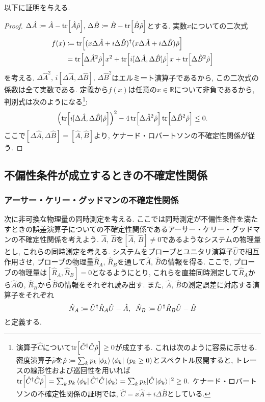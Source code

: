 以下に証明を与える. 
\begin{proof}
\(\Delta\hat{A}\coloneqq\hat{A}-\tr[\hat{A}\hat{\rho}],\,\Delta\hat{B}\coloneqq\hat{B}-\tr[\hat{B}\hat{\rho}]\)とする. 実数\(x\)についての二次式
\begin{equation}
  \begin{aligned}
    f(x)&\coloneqq\tr[(x\Delta\hat{A}+i\Delta\hat{B})^\dag(x\Delta\hat{A}+i\Delta\hat{B})\hat{\rho}]\\
    &=\tr[\Delta\hat{A}^2\hat{\rho}]x^2+\tr[i[\Delta\hat{A},\Delta\hat{B}]\hat{\rho}]x+\tr[\Delta\hat{B}^2\hat{\rho}]
  \end{aligned}
\end{equation}
を考える. \(\Delta\hat{A}^2,\,i[\Delta\hat{A},\Delta\hat{B}],\,\Delta\hat{B}^2\)はエルミート演算子であるから, この二次式の係数は全て実数である. 定義から\(f(x)\)は任意の\(x\in\mathbb{R}\)について非負であるから, 判別式は次のようになる\footnote{演算子\(\hat{C}\)について\(\tr[\hat{C}^\dag\hat{C}\hat{\rho}]\geq0\)が成立する. これは次のように容易に示せる. 密度演算子\(\hat{\rho}\)を\(\hat{\rho}\coloneqq\sum_kp_k\ket{\phi_k}\bra{\phi_k}\,(p_k\geq0)\)とスペクトル展開すると, トレースの線形性および巡回性を用いれば\(\tr[\hat{C}^\dag\hat{C}\hat{\rho}]=\sum_kp_k\bra{\phi_k}\hat{C}^\dag\hat{C}\ket{\phi_k}=\sum_kp_k|\hat{C}\ket{\phi_k}|^2\geq0.\) ケナード・ロバートソンの不確定性関係の証明では, \(\hat{C}=x\hat{A}+i\Delta\hat{B}\)としている.}:
\begin{equation}
  \left(\tr[i[\Delta\hat{A},\Delta\hat{B}]\hat{\rho}]\right)^2-4\tr[\Delta\hat{A}^2\hat{\rho}]\tr[\Delta\hat{B}^2\hat{\rho}]\leq0.
\end{equation}
ここで\([\Delta\hat{A},\Delta\hat{B}]=[\hat{A},\hat{B}]\)より, ケナード・ロバートソンの不確定性関係が従う. 
\end{proof}  

\subsection{不偏性条件が成立するときの不確定性関係}
\subsubsection{アーサー・ケリー・グッドマンの不確定性関係}
次に非可換な物理量の同時測定を考える. ここでは同時測定が不偏性条件を満たすときの誤差演算子についての不確定性関係であるアーサー・ケリー・グッドマンの不確定性関係を考えよう. \(\hat{A},\,\hat{B}\)を\([\hat{A},\,\hat{B}]\neq0\)であるようなシステムの物理量とし, これらの同時測定を考える. システムをプローブとユニタリ演算子\(\hat{U}\)で相互作用させ, プローブの物理量\(\hat{R}_A,\,\hat{R}_B\)を通して\(\hat{A},\,\hat{B}\)の情報を得る. ここで, プローブの物理量は\([\hat{R}_A,\hat{R}_B]=0\)となるようにとり, これらを直接同時測定して\(\hat{R}_A\)から\(\hat{A}\)の, \(\hat{R}_B\)から\(\hat{B}\)の情報をそれぞれ読み出す. また, \(\hat{A},\,\hat{B}\)の測定誤差に対応する演算子をそれぞれ
\begin{equation}
  \hat{N}_A\coloneqq\hat{U}^\dag\hat{R}_A\hat{U}-\hat{A},\hspace{2mm}\hat{N}_B\coloneqq\hat{U}^\dag\hat{R}_B\hat{U}-\hat{B}
\end{equation}
と定義する. 


